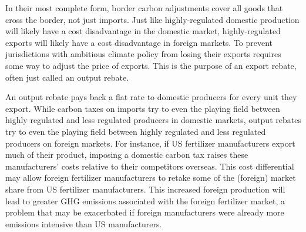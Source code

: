 

In their most complete form, border carbon adjustments cover all goods that cross the border, not just imports. Just like highly-regulated domestic production will likely have a cost disadvantage in the domestic market, highly-regulated exports will likely have a cost disadvantage in foreign markets. To prevent jurisdictions with ambitious climate policy from losing their exports requires some way to adjust the price of exports. This is the purpose of an export rebate, often just called an output rebate.

An output rebate pays back a flat rate to domestic producers for every unit they export. While carbon taxes on imports try to even the playing field between highly regulated and less regulated producers in domestic markets, output rebates try to even the playing field between highly regulated and less regulated producers on foreign markets. For instance, if US fertilizer manufacturers export much of their product, imposing a domestic carbon tax raises these manufacturers' costs relative to their competitors overseas. This cost differential may allow foreign fertilizer manufacturers to retake some of the (foreign) market share from US fertilizer manufacturers. This increased foreign production will lead to greater GHG emissions associated with the foreign fertilizer market, a problem that may be exacerbated if foreign manufacturers were already more emissions intensive than US manufacturers.

